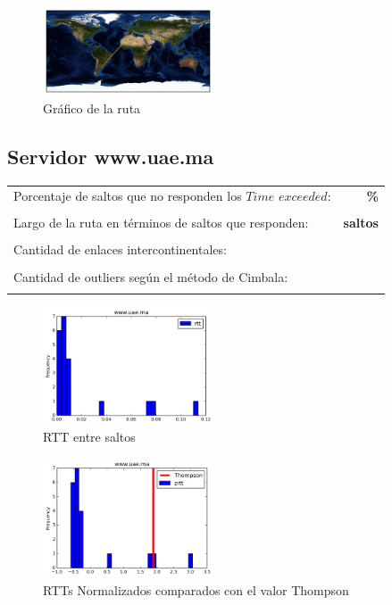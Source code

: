 \begin{figure}[H]
  \centering
    \includegraphics[width=0.45\textwidth]{grafico-rutas/invertisuniversity-ac-in.png}
  \caption{Gráfico de la ruta}
  \label{entropia-s}
\end{figure}




\subsection{Servidor www.uae.ma}

\begin{center}
\begin{tabular}{p{6.5cm}r}
Porcentaje de saltos que no responden los $Time$ $exceeded$: & \textbf{\%} \\ \\ 
Largo de la ruta en términos de saltos que responden: &\textbf{ saltos} \\ \\
Cantidad de enlaces intercontinentales: & \textbf{} \\ \\
Cantidad de outliers según el método de Cimbala: & \textbf{} \\ \\
\end{tabular}
\end{center}


\begin{figure}[H]
  \centering
    \includegraphics[width=0.45\textwidth]{histogramas_rtt/www-uae-ma.png}
  \caption{RTT entre saltos}
  \label{entropia-s}
\end{figure}

\begin{figure}[H]
  \centering
    \includegraphics[width=0.45\textwidth]{histogramas_thompson/www-uae-ma.png}
  \caption{RTTs Normalizados comparados con el valor Thompson}
  \label{entropia-s}
\end{figure}

